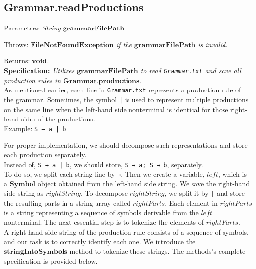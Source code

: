 \vspace{30pt}

\subsection{Grammar.readProductions}

Parameters: \textit{String \(\boldsymbol{grammarFilePath}\).}

Throws: \textit{\(\boldsymbol{FileNotFoundException}\) if the \(\boldsymbol{grammarFilePath}\) is invalid.}

Returns: \textit{\(\boldsymbol{void}\).}\\

\textbf{Specification:} \textit{Utilizes \(\boldsymbol{grammarFilePath}\) to read \texttt{Grammar.txt} and save all production rules in \(\boldsymbol{Grammar.productions}\).}\\

As mentioned earlier, each line in \texttt{Grammar.txt} represents a production rule of the grammar. Sometimes, the symbol \texttt{|} is used to represent multiple productions on the same line when the left-hand side nonterminal is identical for those right-hand sides of the productions.\\

Example: \texttt{S → a | b}

For proper implementation, we should decompose such representations and store each production separately.\\

Instead of,  \texttt{S → a | b}, we should store,  \texttt{S → a; S → b}, separately.\\

To do so, we split each string line by  \texttt{→}. Then we create a variable, \(left\), which is a \(\boldsymbol{Symbol}\) object obtained from the left-hand side string. We save the right-hand side string as  \(rightString\). To decompose  \(rightString\), we split it by \texttt{|} and store the resulting parts in a string array called \(rightParts\). Each element in \(rightParts\) is a string representing a sequence of symbols derivable from the \(left\) nonterminal. The next essential step is to tokenize the elements of \(rightParts\).\\

A right-hand side string of the production rule consists of a sequence of symbols, and our task is to correctly identify each one. We introduce the \(\boldsymbol{stringIntoSymbols}\) method to tokenize these strings. The methods’s complete specification is provided below.\\

